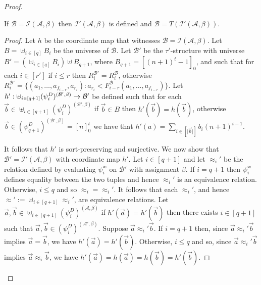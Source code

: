 \documentclass[../main/thesis.tex]{subfiles}
\begin{document}
\begin{proof}
  \begin{claim}
    If $\mathcal{B} = \mathcal{I}(\mathcal{A}, \beta)$ then
    $\mathcal{I}'(\mathcal{A}, \beta)$ is defined and $\mathcal{B} =
    T(\mathcal{I}'(\mathcal{A}, \beta))$.
    \label{claim:not-to-dash}
  \end{claim}
  \begin{proof}
    Let $h$ be the coordinate map that witnesses $\mathcal{B} =
    \mathcal{I}(\mathcal{A}, \beta)$. Let $B = \uplus_{i \in [q]} B_i$ be the
    universe of $\mathcal{B}$. Let $\mathcal{B}'$ be the $\tau'$-structure with
    universe $B' = (\uplus_{i \in [q]} B_i) \uplus B_{q + 1}$, where $B_{q+1} =
    [(n+1)^t - 1]_0$, and such that for each $i \in [r']$ if $i \leq r$ then
    $R^{\mathcal{B}'}_i = R^{\mathcal{B}}_i$, otherwise $R^{\mathcal{B}'}_i =
    \{(a_1, \ldots, a_{f_{i - r}}, a_{r_i}) : a_{r_i} < F^{\mathcal{B}}_{i -
      r}(a_1, \ldots, a_{f_{i - r}}) \}$. Let $h' : \uplus_{i \in [q+1]}
    (\psi^D_i)^{(\mathcal{B}', \beta)} \rightarrow \mathcal{B}'$ be defined such that
    for each $\vec{b} \in \uplus_{i \in [q+1]} (\psi^D_i)^{(\mathcal{B}',
      \beta)}$ if $\vec{b} \in B$ then $h'(\vec{b}) = h(\vec{b})$, otherwise
    $\vec{b} \in (\psi^D_{q+1})^{(\mathcal{B}', \beta)} = [n]^t_0$ we have that
    $h'(a) = \sum_{i \in [\vert \vec{b} \vert]} b_i (n+1)^{i-1}$.

    It follows that $h'$ is sort-preserving and surjective. We now show that
    $\mathcal{B}' = \mathcal{I}'(\mathcal{A}, \beta)$ with coordinate map $h'$.
    Let $i \in [q+1]$ and let $\approx_i'$ be the relation defined by evaluating
    $\psi^{\approx}_i$ on $\mathcal{B}'$ with assignment $\beta$. If $i = q + 1
    $ then $\psi^\approx_i$ defines equality between the two tuples and hence
    $\approx_i'$ is an equivalence relation. Otherwise, $i \leq q$ and so
    $\approx_i = \approx_i'$. It follows that each $\approx_i'$, and hence
    $\approx' := \uplus_{i \in [q+1]} \approx_i'$, are equivalence relations.
    Let $\vec{a}, \vec{b} \in \uplus_{i \in [q + 1]}(\psi^D_i)^{(\mathcal{A},
      \beta)}$ if $h'(\vec{a}) = h'(\vec{b})$ then there exists $i \in [q + 1]$
    such that $\vec{a}, \vec{b} \in (\psi^D_i)^{(\mathcal{A}', \beta)}$. Suppose
    $\vec{a} \approx_i' \vec{b}$. If $i = q + 1$ then, since $\vec{a} \approx_i'
    \vec{b}$ implies $\vec{a} = \vec{b}$, we have $h'(\vec{a}) = h'(\vec{b})$.
    Otherwise, $i \leq q$ and so, since $\vec{a} \approx_i' \vec{b}$ implies
    $\vec{a} \approx_i \vec{b}$, we have $h'(\vec{a}) = h(\vec{a}) = h(\vec{b})
    = h'(\vec{b})$.


\end{proof}
\end{proof}
\end{document}
